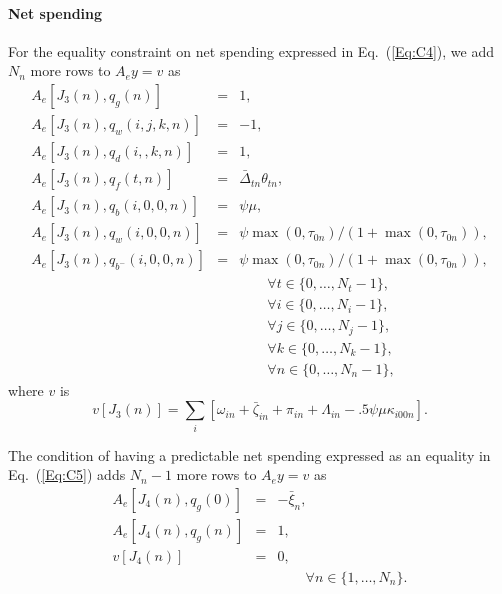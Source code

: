 \documentclass{report}[fleqn,12pt]
\begin{document}
\paragraph*{Net spending}
For the equality constraint on net spending expressed in Eq.~(\ref{Eq:C4}),
we add $N_n$ more rows to $A_ey = v$ as
\begin{eqnarray}
	A_e[J_3(n), q_g(n)] &=& 1, \nonumber \\
	A_e[J_3(n), q_w(i, j ,k, n)] &=& -1,\nonumber \\
	A_e[J_3(n), q_d(i, ,k, n)] &=& 1, \nonumber \\
	A_e[J_3(n), q_f(t, n)] &=& \bar\Delta_{t n}\theta_{t n}, \nonumber \\
	A_e[J_3(n), q_b(i, 0, 0, n)] &=& \psi\mu, \nonumber \\
	A_e[J_3(n), q_w(i, 0, 0, n)] &=& \psi\max(0, \tau_{0n})/(1+\max(0, \tau_{0n})), \nonumber \\
	A_e[J_3(n), q_{b^-}(i, 0, 0, n)] &=& \psi\max(0, \tau_{0n})/(1+\max(0, \tau_{0n})), \\
	&&\qquad\forall t \in \{0,\ldots, N_t-1\},\nonumber\\
	&&\qquad\forall i \in \{0,\ldots, N_i-1\},\nonumber\\
	&&\qquad\forall j \in \{0,\ldots, N_j-1\},\nonumber\\
	&&\qquad\forall k \in \{0,\ldots, N_k-1\},\nonumber\\
	&&\qquad\forall n \in \{0,\ldots, N_n-1\}, \nonumber
\end{eqnarray}
where $v$ is
\begin{equation}
	v[J_3(n)] = \sum_i [\omega_{in} + \bar\zeta_{in} + \pi_{in}
	+ \Lambda_{in} - .5\psi\mu\kappa_{i00n}].
\end{equation}

The condition of having a predictable net spending expressed as an
equality in Eq.~(\ref{Eq:C5}) adds $N_n-1$ more rows to $A_ey = v$ as
\begin{eqnarray}
	A_e[J_4(n), q_g(0)] &=& -\bar{\xi}_n, \nonumber \\
	A_e[J_4(n), q_g(n)] &=& 1, \nonumber \\
	v[J_4(n)] &=& 0, \\
	&&\qquad\forall n \in \{1,\ldots, N_n\}. \nonumber
\end{eqnarray}
\end{document}
